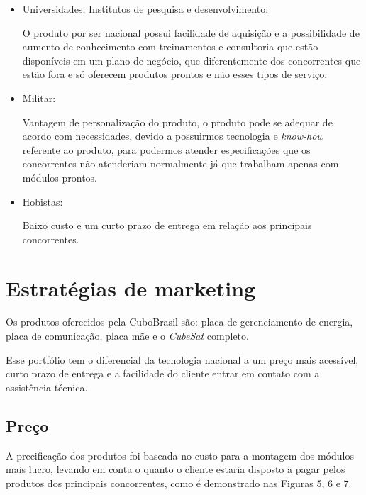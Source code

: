 \documentclass[
	12pt,				%
	openright,			%
	oneside,			%
	a4paper,			%
	english,			%
	french,				%
	spanish,			%
	brazil				%
	]{abntex2}
\begin{document}
	\begin{itemize}
		\item Universidades, Institutos de pesquisa e desenvolvimento:
		
		O produto por ser nacional possui facilidade de aquisição e a possibilidade de aumento de conhecimento com treinamentos e consultoria que estão disponíveis em um plano de negócio, que diferentemente dos concorrentes que estão fora e só oferecem produtos prontos e não esses tipos de serviço.
		
		\item Militar:
		
		Vantagem de personalização do produto, o produto pode se adequar de acordo com necessidades, devido a possuirmos tecnologia e \textit{know-how} referente ao produto, para podermos atender especificações que os concorrentes não atenderiam normalmente já que trabalham apenas com módulos prontos.
		
		\item Hobistas:
		
		Baixo custo e um curto prazo de entrega em relação aos principais concorrentes.
	\end{itemize}
	
\section[Estratégias de marketing]{Estratégias de marketing}

	Os produtos oferecidos pela CuboBrasil são: placa de gerenciamento de energia, placa de comunicação, placa mãe e o \textit{CubeSat} completo.
	
	Esse portfólio tem o diferencial da tecnologia nacional a um preço mais acessível, curto prazo de entrega e a facilidade do cliente entrar em contato com a assistência técnica.
	
\subsection[Preço]{Preço}

	 A precificação dos produtos foi baseada no custo para a montagem dos módulos mais lucro, levando em conta o quanto o cliente estaria disposto a pagar pelos produtos dos principais concorrentes, como é demonstrado nas Figuras 5, 6 e 7.
	 
\end{document}
